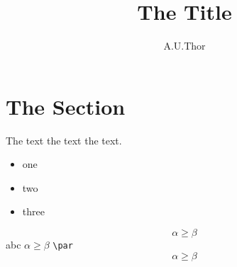 \documentclass[11pt,a4paper]{scrartcl}
\begin{document}

\title{The Title}
\author{A.U.Thor}
\maketitle

\section{The Section}

The text the text the text.

\begin{itemize}
\item one
\item two
\item three
\end{itemize}

$$\alpha\geq\beta$$
abc
$\alpha\geq\beta$
\verb|\par|
\[\alpha\geq\beta\]
\end{document}
